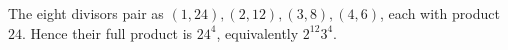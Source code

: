 The eight divisors pair as $(1,24),(2,12),(3,8),(4,6)$, each with product $24$. Hence their full product is $\boxed{24^4}$, equivalently $2^{12}3^4$.
